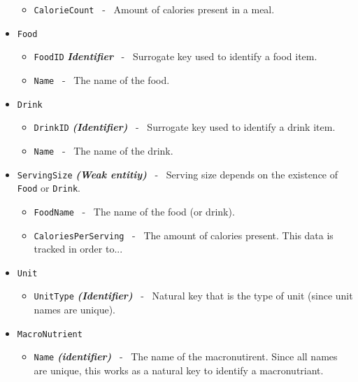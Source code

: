 \documentclass{report}
\begin{document}
\begin{itemize}
\begin{itemize}[label=$\circ$]
            \item \texttt{CalorieCount} \ - \ Amount of calories present in a meal.
        \end{itemize}
    \item\texttt{Food}
        \begin{itemize}[label=$\circ$]
            \item \texttt{FoodID} \textit{\textbf{Identifier}} \ - \ Surrogate key used to identify a food item.
            \item \texttt{Name} \ - \ The name of the food.
        \end{itemize}
    \item \texttt{Drink}
        \begin{itemize}[label=$\circ$]
            \item \texttt{DrinkID} \textit{\textbf{(Identifier)}} \ - \ Surrogate key used to identify a drink item.
            \item \texttt{Name} \ - \ The name of the drink.
        \end{itemize}
            \item \texttt{ServingSize} \textit{\textbf{(Weak entitiy)}} \ - \ Serving size depends on the existence of \texttt{Food} or \texttt{Drink}.
                \begin{itemize}[label=$\circ$]
            \item \texttt{FoodName} \ - \ The name of the food (or drink).
            \item \texttt{CaloriesPerServing} \ - \ The amount of calories present. This data is tracked in order to...
                \end{itemize}
        \begin{itemize}[label=$\circ$]
        \end{itemize}
    \item \texttt{Unit}
        \begin{itemize}[label=$\circ$]
            \item \texttt{UnitType} \textit{\textbf{(Identifier)}} \ - \ Natural key that is the type of unit (since unit names are unique).
        \end{itemize}
    \item\texttt{MacroNutrient}
        \begin{itemize}[label=$\circ$]
            \item \texttt{Name} \textit{\textbf{(identifier)}} \ - \ The name of the macronutirent. Since all names are unique, this works as a natural key to identify a macronutriant.

\end{itemize}
\end{itemize}
\end{document}
